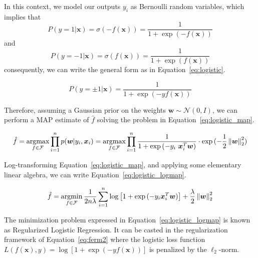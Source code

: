 In this context, we model our outputs $y_i$ as Bernoulli random variables, which implies that
$$
P(y=1 | \bm{x}) = \sigma(-f(\bm{x})) = \frac{1}{1+\exp{(-f(\bm{x}))}}
$$
and
$$
P(y=-1 | \bm{x}) = \sigma(f(\bm{x})) = \frac{1}{1+\exp{(f(\bm{x}))}}
$$
consequently, we can write the general form as in Equation~\eqref{eq:logistic}.

\begin{equation} \label{eq:logistic}
	P(y = \pm 1 | \bm{x}) = \frac{1}{1+\exp{(-y f(\bm{x}))}}
\end{equation}

Therefore, assuming a Gaussian prior on the weights $\bm{w} \sim \mathcal{N}(0,I)$, we can perform a MAP estimate of $\hat f$ solving the problem in Equation~\eqref{eq:logistic_map}.

\begin{equation} \label{eq:logistic_map}
	\hat f = \mathop{\mathrm{argmax}}\limits_{f \in \mathcal{F}} \prod_{i=1}^n p(\bm{w}|y_i, \bm{x}_i) = \mathop{\mathrm{argmax}}\limits_{f \in \mathcal{F}} \prod_{i=1}^n \frac{1}{1+\exp{(-y_i~\bm{x}_i^T\bm{w})}} \cdot \exp{(-\frac{1}{2} \left\lVert\bm{w}\right\rVert_2^2)}
\end{equation}

Log-transforming Equation~\eqref{eq:logistic_map}, and applying some elementary linear algebra, we can write Equation~\eqref{eq:logistic_logmap}.

\begin{equation} \label{eq:logistic_logmap}
	\hat f = \mathop{\mathrm{argmin}}\limits_{f \in \mathcal{F}} \frac{1}{2n\lambda} \sum_{i=1}^n \log \big[ 1 + \exp{(-y_i \bm{x}_i^T \bm{w})} \big] + \frac{\lambda}{2} \left\lVert\bm{w}\right\rVert_2^2
\end{equation}

The minimization problem expressed in Equation~\eqref{eq:logistic_logmap} is known as Regularized Logistic Regression. It can be casted in the regularization framework of Equation~\eqref{eq:ferm2} where the logistic loss function $L(f(\bm{x}),y) = \log{[1+\exp{(-yf(\bm{x}))}]}$ is penalized by the $\ell_2$-norm.









